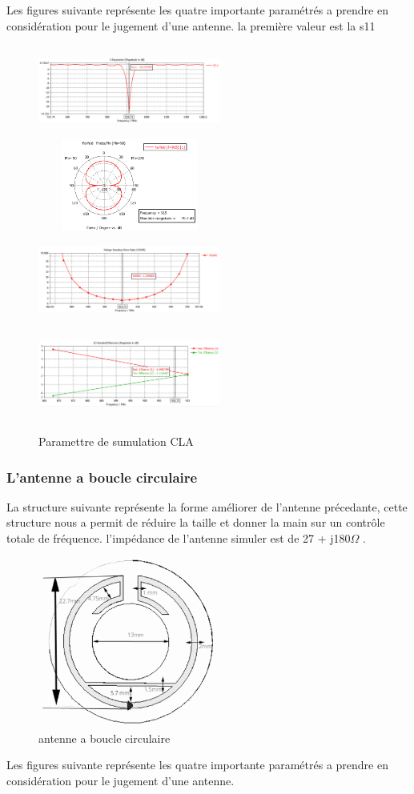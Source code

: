 \documentclass[11pt, a4paper, twoside]{book}
\begin{document}
Les figures suivante représente les quatre importante paramétrés a prendre en considération pour le jugement d'une antenne. la première valeur est la s11
\begin{figure}[h]
\centering
\includegraphics[width=6cm,height=3cm]{clas11}
\includegraphics[width=6cm,height=3cm]{clapolfarfield}
\includegraphics[width=6cm,height=3cm]{clavswr}
\includegraphics[width=6cm,height=3cm]{claefficency}
\caption{Paramettre de sumulation CLA}
\end{figure} 

\subsubsection{L'antenne a boucle circulaire}
La structure suivante représente  la forme améliorer de l'antenne précedante, cette structure nous a permit de réduire la taille et donner la main sur un contrôle totale de fréquence. l'impédance de l'antenne simuler est  de 27 + j180\(\Omega\)
.
\begin{figure}[H]
\centering
\includegraphics[width=6cm]{1STee}
\caption{antenne a boucle circulaire}
\end{figure}
Les figures suivante représente les quatre importante paramétrés a prendre en considération pour le jugement d'une antenne.
\end{document}
